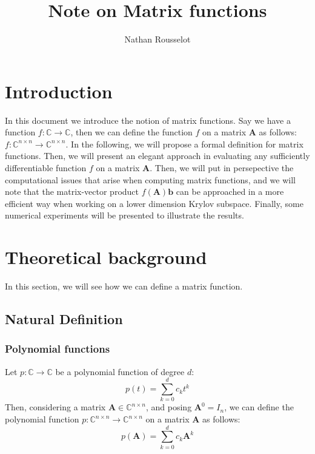 \documentclass[11pt]{article}
\title{Note on Matrix functions} %
\author{Nathan Rousselot}
\numberwithin{equation}{section}
\begin{document}
\maketitle
\tableofcontents

\section{Introduction}
In this document we introduce the notion of matrix functions. Say we have a function $f:\mathbb{C}\rightarrow\mathbb{C}$, then we can define the function $f$ on a matrix $\mathbf{A}$ as follows: $f:\mathbb{C}^{n\times n}\rightarrow\mathbb{C}^{n\times n}$. In the following, we will propose a formal definition for matrix functions. Then, we will present an elegant approach in evaluating any sufficiently differentiable function $f$ on a matrix $\mathbf{A}$. Then, we will put in persepective the computational issues that arise when computing matrix functions, and we will note that the matrix-vector product $f(\mathbf{A})\mathbf{b}$ can be approached in a more efficient way when working on a lower dimension Krylov subspace. Finally, some numerical experiments will be presented to illustrate the results.

\section{Theoretical background}
In this section, we will see how we can define a matrix function.
\subsection{Natural Definition}
\subsubsection*{Polynomial functions}
Let $p:\mathbb{C}\rightarrow\mathbb{C}$ be a polynomial function of degree $d$:
\begin{equation}
    p(t) = \sum_{k=0}^d c_k t^k
\end{equation}
Then, considering a matrix $\mathbf{A}\in\mathbb{C}^{n\times n}$, and posing $\mathbf{A}^0 = I_n$, we can define the polynomial function $p:\mathbb{C}^{n\times n}\rightarrow\mathbb{C}^{n\times n}$ on a matrix $\mathbf{A}$ as follows:
\begin{equation}
    p(\mathbf{A}) = \sum_{k=0}^d c_k \mathbf{A}^k
\end{equation}
\end{document}
